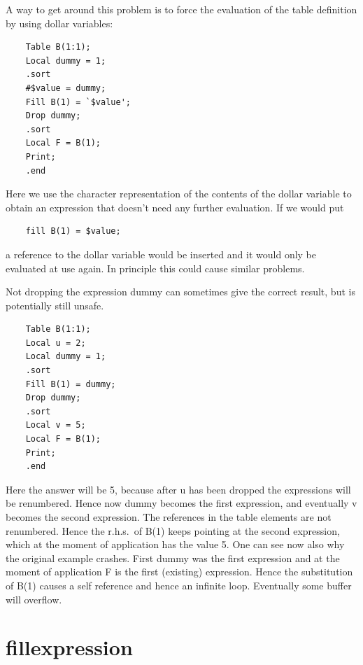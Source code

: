 \noindent A way to get around this problem is to force the evaluation of 
the table definition by using dollar 
variables:
\begin{verbatim}
    Table B(1:1);
    Local dummy = 1;
    .sort
    #$value = dummy;
    Fill B(1) = `$value';
    Drop dummy;
    .sort
    Local F = B(1);
    Print;
    .end
\end{verbatim}
Here we use the character representation of the contents of the dollar 
variable to obtain an expression that doesn't need any further evaluation. 
If we would put
\begin{verbatim}
    fill B(1) = $value;
\end{verbatim}
a reference to the dollar variable would be inserted and it would only be 
evaluated at use again. In principle this could cause similar problems.

\noindent Not dropping the expression dummy can sometimes give the correct 
result, but is potentially still unsafe. 
\begin{verbatim}
    Table B(1:1);
    Local u = 2;
    Local dummy = 1;
    .sort
    Fill B(1) = dummy;
    Drop dummy;
    .sort
    Local v = 5;
    Local F = B(1);
    Print;
    .end
\end{verbatim}
Here the answer will be 5, because after u has been dropped the expressions 
will be renumbered. Hence now dummy becomes the first expression, and 
eventually v becomes the second expression. The references in the table 
elements are not renumbered. Hence the r.h.s.\ of B(1) keeps pointing at the 
second expression, which at the moment of application has the value 5. One 
can see now also why the original example crashes. First dummy was the 
first expression and at the moment of application F is the first (existing) 
expression. Hence the substitution of B(1) causes a self reference and 
hence an infinite loop. Eventually some buffer will 
overflow.
\vspace{10mm}

 
\section{fillexpression}
\label{substafillexpression}


